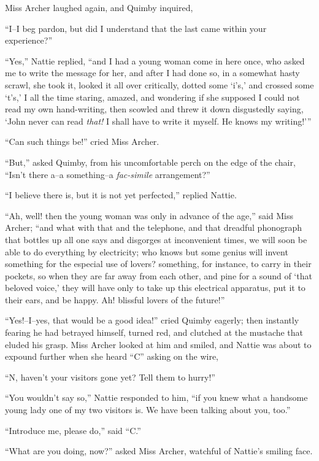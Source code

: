 Miss Archer laughed again, and Quimby inquired,

``I--I beg pardon, but did I understand that the last came within your
experience?''

``Yes,'' Nattie replied, ``and I had a young woman come in here once, who
asked me to write the message for her, and after I had done so, in a
somewhat hasty scrawl, she took it, looked it all over critically,
dotted some `i's,' and crossed some `t's,' I all the time staring,
amazed, and wondering if she supposed I could not read my own
hand-writing, then scowled and threw it down disgustedly saying, `John
never can read \emph{that!} I shall have to write it myself. He knows my
writing!'{}''

``Can such things be!'' cried Miss Archer.

``But,'' asked Quimby, from his uncomfortable perch on the edge of the
chair, ``Isn't there a--a something--a \emph{fac-simile} arrangement?''

``I believe there is, but it is not yet perfected,'' replied Nattie.

``Ah, well! then the young woman was only in advance of the age,'' said
Miss Archer; ``and what with that and the telephone, and that dreadful
phonograph that bottles up all one says and disgorges at inconvenient
times, we will soon be able to do everything by electricity; who knows
but some genius will invent something for the especial use of lovers?
something, for instance, to carry in their pockets, so when they are far
away from each other, and pine for a sound of `that beloved voice,' they
will have only to take up this electrical apparatus, put it to their
ears, and be happy. Ah! blissful lovers of the future!''

``Yes!--I--yes, that would be a good idea!'' cried Quimby eagerly; then
instantly fearing he had betrayed himself, turned red, and clutched at
the mustache that eluded his grasp. Miss Archer looked at him and
smiled, and Nattie was about to expound further when she heard ``C''
asking on the wire,

``N, haven't your visitors gone yet? Tell them to hurry!''

``You wouldn't say so,'' Nattie responded to him, ``if you knew what a
handsome young lady one of my two visitors is. We have been talking
about you, too.''

``Introduce me, please do,'' said ``C.''

``What are you doing, now?'' asked Miss Archer, watchful of Nattie's
smiling face.

